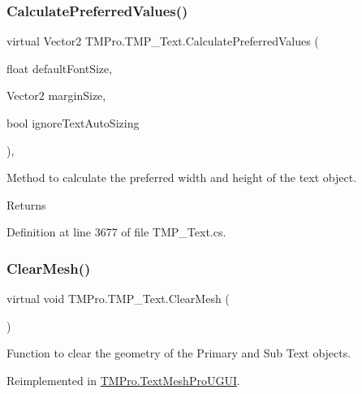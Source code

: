 \subsubsection{\texorpdfstring{CalculatePreferredValues()}{CalculatePreferredValues()}}
{\footnotesize\ttfamily virtual Vector2 T\+M\+Pro.\+T\+M\+P\+\_\+\+Text.\+Calculate\+Preferred\+Values (\begin{DoxyParamCaption}\item[{float}]{default\+Font\+Size,  }\item[{Vector2}]{margin\+Size,  }\item[{bool}]{ignore\+Text\+Auto\+Sizing }\end{DoxyParamCaption})\hspace{0.3cm}{\ttfamily [protected]}, {\ttfamily [virtual]}}



Method to calculate the preferred width and height of the text object. 

\begin{DoxyReturn}{Returns}

\end{DoxyReturn}


Definition at line 3677 of file T\+M\+P\+\_\+\+Text.\+cs.

\mbox{\label{class_t_m_pro_1_1_t_m_p___text_a9bd7b659f2a1b2feb48f3b3008d09ee6}} 
\subsubsection{\texorpdfstring{ClearMesh()}{ClearMesh()}\hspace{0.1cm}{\footnotesize\ttfamily [1/2]}}
{\footnotesize\ttfamily virtual void T\+M\+Pro.\+T\+M\+P\+\_\+\+Text.\+Clear\+Mesh (\begin{DoxyParamCaption}{ }\end{DoxyParamCaption})\hspace{0.3cm}{\ttfamily [virtual]}}



Function to clear the geometry of the Primary and Sub Text objects. 



Reimplemented in \mbox{\hyperlink{class_t_m_pro_1_1_text_mesh_pro_u_g_u_i_a2b3b3a1a8d320d9f39751e7f05b1b2be}{T\+M\+Pro.\+Text\+Mesh\+Pro\+U\+G\+UI}}.



